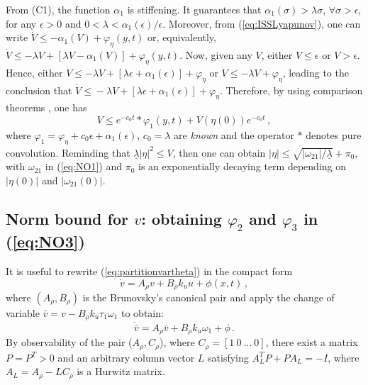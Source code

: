 \documentclass{rncauth}
\begin{document}
From (C1), the function $\alpha_1$ %
is stiffening. It guarantees that
$\alpha_1(\sigma)\!>\!\lambda \sigma$, $\forall
\sigma\!>\!\epsilon$, for any $\epsilon\!>\!0$
and $0\!<\!\lambda\!<\!\alpha_1(\epsilon)/\epsilon$. %
Moreover, from (\ref{eq:ISSLyapunov}), one can write $\dot{V} \leq
-\alpha_1(V) + \varphi_\eta(y,t)$ or, equivalently, $\dot{V} \leq
-\lambda V  + [\lambda V - \alpha_1(V)]+ \varphi_\eta(y,t)$.
%
Now, given any $V$, either $V \leq \epsilon$ or $V > \epsilon$.
Hence, either $\dot{V} \leq -\lambda V  + [\lambda \epsilon +
\alpha_1(\epsilon)]+ \varphi_\eta$ or $\dot{V} \leq -\lambda V  +
\varphi_\eta$, leading to the conclusion that
$\dot{V}\!\leq\!-\lambda V\!+\![\lambda
\epsilon\!+\!\alpha_1(\epsilon)]\!+\!\varphi_\eta$.
%
Therefore, by using comparison theorems \cite{K:02}, one has
%
$$V \leq e^{-c_0 t}*\varphi_1(y,t) + V(\eta(0))e^{-c_0 t}\,,$$
%
where $\varphi_1=\varphi_\eta+c_0 \epsilon + \alpha_1(\epsilon)$,
$c_0=\lambda$ are {\em known} and the operator $*$ denotes pure
convolution. Reminding that $\underline{\lambda} |\eta|^2 \leq V$,
then one can obtain $|\eta| \leq
\sqrt{|\omega_{21}|/\underline{\lambda}} + \pi_{0}$, with
$\omega_{21}$ in (\ref{eq:NO1}) and $\pi_{0}$ is an exponentially
decaying term depending on $|\eta(0)|$ and $|\omega_{21}(0)|$.






\subsection{Norm bound for $v$: obtaining $\varphi_2$ and $\varphi_3$ in (\ref{eq:NO3})}

It is useful to rewrite (\ref{eq:partitionvartheta}) in the
compact form
%
\begin{equation}
\dot{v}=A_\rho v +B_\rho k_u u + \phi(x,t)\,,\label{eq:vartheta}
\end{equation}
%
where $(A_\rho,B_\rho)$ is the Brunovsky's canonical pair and %
apply the change of variable $\bar{v}=v-B_\rho k_u \tau_1
\omega_1$ to obtain: %
%
$$\dot{\bar{v}}=A_\rho \bar{v}+ B_\rho k_u \omega_1+\phi\,.$$
%
By observability of the pair ($A_\rho,C_\rho$), where $C_\rho=[1 \
0 \ \ldots \ 0]$, there exist a matrix $P=P^T>0$ and an arbitrary
column vector $L$ satisfying $A_L^T P + P A_L=-I$, where $A_L
=A_\rho-L C_\rho$ is a Hurwitz matrix.
\end{document}
